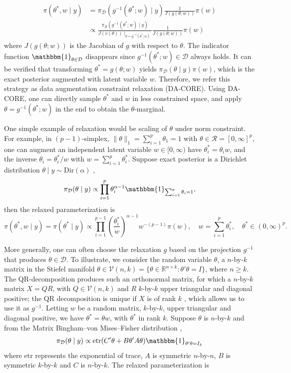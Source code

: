 \documentclass[10pt,fleqn]{article}
\newcommand{\be}{\begin{equation}\begin{aligned}}
\newcommand{\ee}{\end{aligned}\end{equation}}
\newcommand{\bb}[1]{\mathbb{#1}}
\newcommand{\mc}[1]{\mathcal{#1}}
\DeclareMathOperator{\1}{\mathbbm{1}}
\begin{document}
\be
\label{reparameterization}
\pi(\theta^*,w\mid y) & =\pi_{\mc D}(g^{-1}(\theta^*;w)\mid y) \frac{1}{J(g(\theta;w))}  \pi(w) \\
&\propto \frac{\pi_{\mc R}(g^{-1}(\theta^*;w)\mid y) }{ J(v(\theta))\mid_{\theta=g^{-1}(\theta^*;w)} } \frac{1}{J(g(\theta;w))} \pi(w) 
\ee
where   $J(g(\theta;w))$ is the Jacobian of $g$ with respect to $\theta$.
The indicator function $\mathbbm{1}_{\theta\in \mc D}$ disappears since $g^{-1}(\theta^*;w)\in \mc
D$ always holds. It can be verified that transforming $\theta^*=g(\theta;w)$  yields $\pi_{\mc D}(\theta\mid y) \pi(w)$, which is the exact posterior augmented
with latent variable $w$. Therefore, we refer this strategy as data augmentation
constraint relaxation (DA-CORE). Using DA-CORE, one can directly sample $\theta^*$ and $w$ in less constrained
space, and apply $\theta=g^{-1}(\theta^*;w)$ in the end to obtain the $\theta$-marginal.

One simple example of relaxation would be scaling of $\theta$ under  norm constraint. For example, in $(p-1)$-simplex,
$\|\theta\|_1=\sum_{i=1}^p\theta_1=1$ with $\theta\in \mc R=[0,\infty]^p$, one
can augment an independent latent variable $w\in [0,\infty)$ have
$\theta_i^*=\theta_i w$, and the inverse $\theta_i=\theta_i^*/w$ with
$w=\sum_{i=1}^p \theta^*_i$. Suppose exact posterior is a Dirichlet distribution 
$\theta\mid y\sim \text{Dir}(\alpha)$
, 
$$
\pi_{\mc D}(\theta \mid y)\propto \prod_{i=1}^p \theta_i^{\alpha-1}\mathbbm{1}_{\sum_{i=1}^p\theta_i=1},$$
then the relaxed parameterization is $$
\pi(\theta^*,w\mid y) =\pi(\theta^*\mid y)\propto  \prod_{i=1}^{p-1} (\frac{\theta_i^*}{w})^{\alpha-1}  w^{-(p-1)} \pi(w), \quad w=\sum_{i=1}^p \theta^*_i, \quad \theta^*\in(0,\infty)^p.$$

More generally, one can often choose the relaxation $g$ based on the projection $g^{-1}$ that produces $\theta\in \mc D$. To illustrate, we consider the random variable
$\theta$, a $n$-by-$k$ matrix in the Stiefel manifold $\theta\in \mc V(n,k)=\{\theta\in \bb R^{n\times
k}: \theta'\theta=I\}$, where $n\ge k$. The QR-decomposition produces such
an orthonormal matrix, for which a $n$-by-$k$ matrix $X=QR$,
with $Q\in \mc V(n,k)$ and $R$ $k$-by-$k$ upper triangular and diagonal positive;
 the
QR decomposition is unique if $X$ is of rank $k$ \citep{gulliksson1992modifying}, which allows us to
use it as $g^{-1}$. Letting $w$ be a random matrix, $k$-by-$k$, upper triangular and diagonal positive, we have $\theta^*=\theta w$, with $\theta^*$ in rank
$k$. Suppose $\theta$ is $n$-by-$k$ and from the Matrix Bingham--von Mises--Fisher distribution
\citep{hoff2009simulation},
$$\pi_{\mc D}(\theta\mid y)\propto \text{etr}(C'\theta+B\theta'A\theta)  \mathbbm{1}_{\theta'\theta=I_k}$$
where $\text{etr}$ represents the exponential of trace, $A$ is symmetric $n$-by-$n$, $B$ is symmetric $k$-by-$k$ and $C$ is $n$-by-$k$. The relaxed
parameterization is
\end{document}
